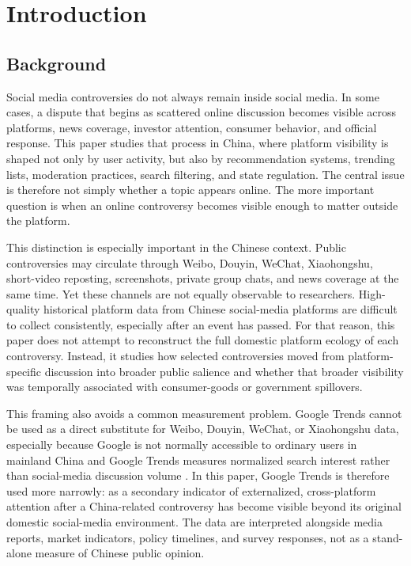 \documentclass[conference]{IEEEtran}
\begin{document}
\section{Introduction}
\subsection{Background}
Social media controversies do not always remain inside social media. In some cases, a dispute that begins as scattered online discussion becomes visible across platforms, news coverage, investor attention, consumer behavior, and official response. This paper studies that process in China, where platform visibility is shaped not only by user activity, but also by recommendation systems, trending lists, moderation practices, search filtering, and state regulation. The central issue is therefore not simply whether a topic appears online. The more important question is when an online controversy becomes visible enough to matter outside the platform.

This distinction is especially important in the Chinese context. Public controversies may circulate through Weibo, Douyin, WeChat, Xiaohongshu, short-video reposting, screenshots, private group chats, and news coverage at the same time. Yet these channels are not equally observable to researchers. High-quality historical platform data from Chinese social-media platforms are difficult to collect consistently, especially after an event has passed. For that reason, this paper does not attempt to reconstruct the full domestic platform ecology of each controversy. Instead, it studies how selected controversies moved from platform-specific discussion into broader public salience and whether that broader visibility was temporally associated with consumer-goods or government spillovers.

This framing also avoids a common measurement problem. Google Trends cannot be used as a direct substitute for Weibo, Douyin, WeChat, or Xiaohongshu data, especially because Google is not normally accessible to ordinary users in mainland China and Google Trends measures normalized search interest rather than social-media discussion volume \cite{googlechina2010,googlechina2012,googletrendsfaq}. In this paper, Google Trends is therefore used more narrowly: as a secondary indicator of externalized, cross-platform attention after a China-related controversy has become visible beyond its original domestic social-media environment. The data are interpreted alongside media reports, market indicators, policy timelines, and survey responses, not as a stand-alone measure of Chinese public opinion.
\end{document}
